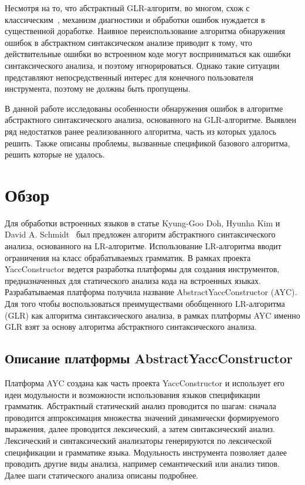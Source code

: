 Несмотря на то, что абстрактный GLR-алгоритм, во многом, схож с классическим~\cite{grigorev2013glr}, 
механизм диагностики и обработки ошибок нуждается в существенной доработке. 
Наивное переиспользование алгоритма обнаружения ошибок в  абстрактном синтаксическом 
анализе приводит к тому, что действительные ошибки во встроенном коде могут 
восприниматься как ошибки синтаксического анализа, и поэтому игнорироваться. 
Однако такие ситуации представляют непосредственный интерес для конечного пользователя 
инструмента, поэтому не должны быть пропущены. 

В данной работе исследованы особенности обнаружения ошибок в алгоритме абстрактного 
синтаксического анализа, основанного на GLR-алгоритме. Выявлен ряд недостатков 
ранее реализованного алгоритма, часть из которых удалось решить. Также описаны 
проблемы, вызванные спецификой базового алгоритма, решить которые не удалось. 

\section{Обзор}
Для обработки встроенных языков в статье Kyung-Goo Doh, Hyunha Kim и David A. 
Schmidt~\cite{Doh:2011:AL:2074591.2074599} был предложен алгоритм абстрактного 
синтаксического анализа, основанного на LR-алгоритме. Использование LR-алгоритма
вводит ограничения на класс обрабатываемых грамматик. В рамках проекта 
YaccConstructor ведется разработка платформы для создания инструментов, 
предназначенных для статического анализа кода на встроенных языках. Разрабатываемая 
платформа получила название AbstractYaccConstructor (AYC). Для того чтобы 
воспользоваться преимуществами обобщенного LR-алгоритма (GLR) как алгоритма 
синтаксического анализа, в рамках платформы AYC именно GLR взят за основу алгоритма 
абстрактного синтаксического анализа. 

\subsection{Описание платформы AbstractYaccConstructor}
Платформа AYC создана как часть проекта YaccConstructor и использует его идеи 
модульности и возможности использования языков спецификации грамматик. Абстрактный
статический анализ проводится по шагам: сначала проводится аппроксимация множества 
значений динамически формируемого выражения, далее проводится лексический, а затем
синтаксический анализ. Лексический и синтаксический анализаторы генерируются по 
лексической спецификации и грамматике языка. Модульность инструмента позволяет 
далее проводить другие виды анализа, например семантический или анализ типов. 
Далее шаги статического анализа описаны подробнее. 

